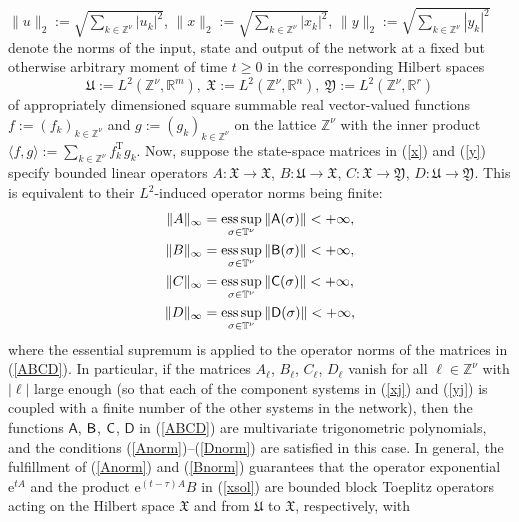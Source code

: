 \documentclass[letterpaper, 10pt, conference]{ieeeconf}  %
\def\>{\geqslant}           %
\def\mZ{\mathbb{Z}}    %
\def\mR{\mathbb{R}}    %
\def\rT{\mathrm{T}}        %
\def\bra{{\langle}}
\def\ket{{\rangle}}
\def\re{\mathrm{e}}        %
\def\sA{\mathsf{A}}
\def\sB{\mathsf{B}}
\def\sC{\mathsf{C}}
\def\sD{\mathsf{D}}
\def\fX{\mathfrak{X}}
\def\fU{\mathfrak{U}}
\def\sB{{\sf B}}
\def\sC{{\sf C}}
\def\fY{\mathfrak{Y}}
\def\mT{\mathbb{T}}
\def\mZ{\mathbb{Z}}
\def\esssup{\mathop{\mathrm{ess\, sup}}}    %
\begin{document}
$
    \|u\|_2
    :=
    \sqrt{\sum_{k \in \mZ^\nu} |u_k|^2}$,
$
    \|x\|_2
    := \sqrt{\sum_{k \in \mZ^\nu} |x_k|^2}$,
$\|y\|_2
    :=
    \sqrt{\sum_{k \in \mZ^\nu} |y_k|^2}
$
denote the norms of the input, state and output of the network at a fixed but otherwise arbitrary moment of time $t\>0$ in the corresponding Hilbert spaces
\begin{equation}
\label{fU_fX_fY}
    \fU
    := L^2(\mZ^\nu, \mR^m),
    \
     \fX
     :=
     L^2(\mZ^\nu,\mR^n),
     \
     \fY
     :=
     L^2(\mZ^\nu, \mR^r)
\end{equation}
of appropriately dimensioned square summable real vector-valued functions $f:= (f_k)_{k \in \mZ^\nu}$ and $g:=(g_k)_{k \in \mZ^\nu}$ on the lattice $\mZ^\nu$ with the inner product $\bra f, g\ket := \sum_{k\in \mZ^\nu} f_k^\rT g_k$. Now, suppose the state-space matrices in (\ref{x}) and (\ref{y})  specify bounded linear operators $A: \fX \to \fX$, $B:\fU\to \fX$, $C:\fX\to \fY$, $D:\fU\to \fY$. This is equivalent to their $L^2$-induced operator norms being finite:
\begin{align}
\label{Anorm}
    \|A\|_{\infty}
    & =
    \esssup_{\sigma \in \mT^\nu}
    \|\sA(\sigma)\|
    <+\infty,\\
\label{Bnorm}
    \|B\|_{\infty}
    & =
    \esssup_{\sigma \in \mT^\nu}
    \|\sB(\sigma)\|
    <+\infty,\\
\label{Cnorm}
    \|C\|_{\infty}
    & =
    \esssup_{\sigma \in \mT^\nu}
    \|\sC(\sigma)\|
    <+\infty,\\
\label{Dnorm}
    \|D\|_{\infty}
    & =
    \esssup_{\sigma \in \mT^\nu}
    \|\sD(\sigma)\|
    <+\infty,
\end{align}
where the essential supremum is applied to the operator  norms of the matrices in (\ref{ABCD}).
In particular, if the matrices  $A_\ell$, $B_\ell$, $C_\ell$, $D_\ell$  vanish for all $\ell \in \mZ^\nu$ with $|\ell|$ large enough (so that each of the component systems in (\ref{xj}) and (\ref{yj}) is coupled with a finite number of the other systems in the network), then the functions $\sA$, $\sB$, $\sC$, $\sD$ in (\ref{ABCD}) are multivariate trigonometric polynomials, and the conditions (\ref{Anorm})--(\ref{Dnorm}) are satisfied in this case.  %
In general, the fulfillment of (\ref{Anorm}) and (\ref{Bnorm}) guarantees that the operator exponential $\re^{tA}$ and the product $\re^{(t-\tau)A}B$ in (\ref{xsol}) are bounded block Toeplitz   operators acting on the Hilbert space $\fX$ and from $\fU$ to $\fX$, respectively, with
\end{document}
